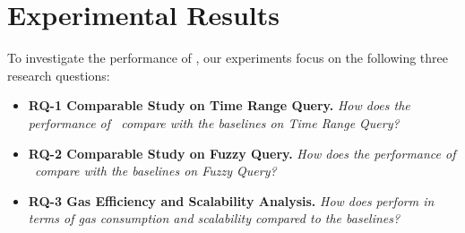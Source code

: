 \section{Experimental Results}


To investigate the performance of \Chain, our experiments focus on the following three research questions:


\begin{itemize}[leftmargin=*]
\item \textbf{RQ-1 Comparable Study on Time Range Query.} {\em How does the performance of ~\Chain compare with the baselines on Time Range Query?}


\item \textbf{RQ-2 Comparable Study on Fuzzy Query.} {\em How does the performance of ~\Chain compare with the baselines on Fuzzy Query?}

\item \textbf{RQ-3 Gas Efficiency and Scalability Analysis.} {\em How does \Chain perform in terms of gas consumption and scalability compared to the baselines?}
\end{itemize}















